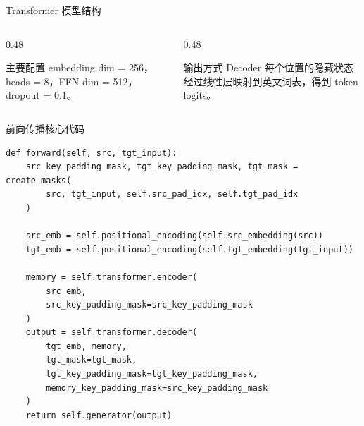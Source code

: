\documentclass[aspectratio=169,10pt]{ctexbeamer}
\begin{document}
\begin{frame}{Transformer 模型结构}
	\centering

	\vspace{0.55cm}
	\begin{columns}[T,onlytextwidth]
		\begin{column}{0.48\textwidth}
			\begin{block}{主要配置}
				embedding dim = 256，heads = 8，FFN dim = 512，dropout = 0.1。
			\end{block}
		\end{column}
		\begin{column}{0.48\textwidth}
			\begin{block}{输出方式}
				Decoder 每个位置的隐藏状态经过线性层映射到英文词表，得到 token logits。
			\end{block}
		\end{column}
	\end{columns}
\end{frame}

\begin{frame}[fragile]{前向传播核心代码}
\begin{lstlisting}
def forward(self, src, tgt_input):
    src_key_padding_mask, tgt_key_padding_mask, tgt_mask = create_masks(
        src, tgt_input, self.src_pad_idx, self.tgt_pad_idx
    )

    src_emb = self.positional_encoding(self.src_embedding(src))
    tgt_emb = self.positional_encoding(self.tgt_embedding(tgt_input))

    memory = self.transformer.encoder(
        src_emb,
        src_key_padding_mask=src_key_padding_mask
    )
    output = self.transformer.decoder(
        tgt_emb, memory,
        tgt_mask=tgt_mask,
        tgt_key_padding_mask=tgt_key_padding_mask,
        memory_key_padding_mask=src_key_padding_mask
    )
    return self.generator(output)
\end{lstlisting}
\end{frame}
\end{document}
